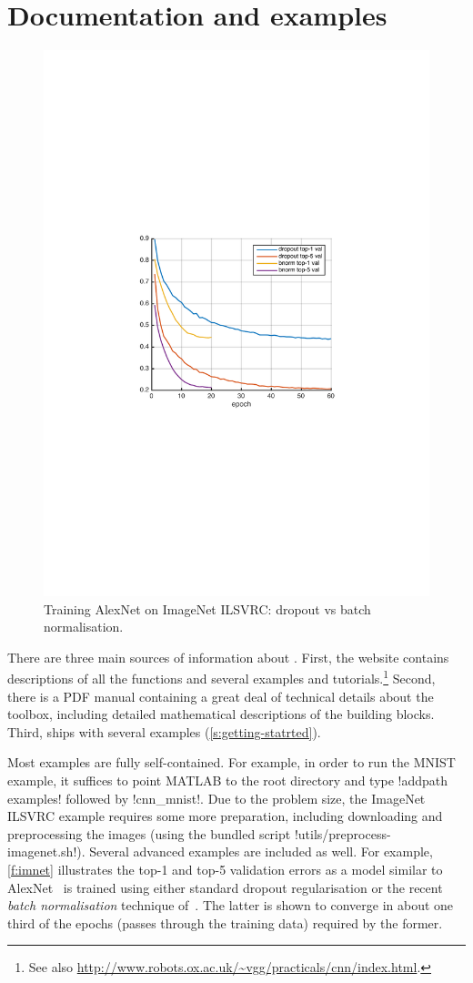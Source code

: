 \section{Documentation and examples}\label{s:examples}

\begin{figure}
\centering
\includegraphics[width=0.65\columnwidth]{figures/imnet}
\vspace{-1em}
\caption{Training AlexNet on ImageNet ILSVRC: dropout vs batch normalisation.}\label{f:imnet}
\end{figure}

There are three main sources of information about \matconvnet. First, the website contains descriptions of all the functions and several examples and tutorials.\footnote{\small See also \url{http://www.robots.ox.ac.uk/~vgg/practicals/cnn/index.html}.} Second, there is a PDF manual containing a great deal of technical details about the toolbox, including detailed mathematical descriptions of the building blocks. Third, \matconvnet ships with several examples (\autoref{s:getting-statrted}).

Most examples are fully self-contained. For example, in order to run the MNIST example, it suffices to point MATLAB to the \matconvnet root directory and type !addpath examples! followed by !cnn_mnist!. Due to the problem size, the ImageNet ILSVRC example requires some more preparation, including downloading and preprocessing the images (using the bundled script !utils/preprocess-imagenet.sh!). Several advanced examples are included as well. For example, \autoref{f:imnet} illustrates the top-1 and top-5 validation errors as a model similar to AlexNet~\cite{krizhevsky12imagenet} is trained using either standard dropout regularisation or the recent \emph{batch normalisation} technique of~\cite{ioffe15batch}. The latter is shown to converge in about one third of the epochs (passes through the training data) required by the former.

